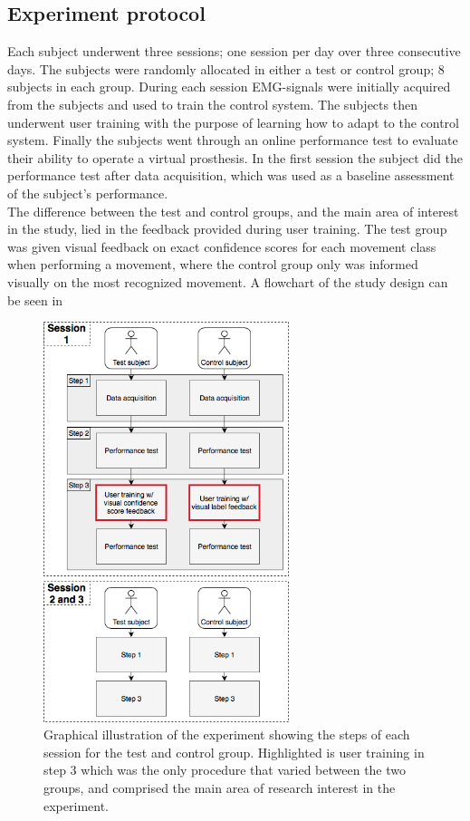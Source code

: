 \subsection{Experiment protocol}
Each subject underwent three sessions; one session per day over three consecutive days. The subjects were randomly allocated in either a test or control group; 8 subjects in each group. During each session EMG-signals were initially acquired from the subjects and used to train the control system. The subjects then underwent user training with the purpose of learning how to adapt to the control system. Finally the subjects went through an online performance test to evaluate their ability to operate a virtual prosthesis. In the first session the subject did the performance test after data acquisition, which was used as a baseline assessment of the subject's performance. \\
The difference between the test and control groups, and the main area of interest in the study, lied in the feedback provided during user training. The test group was given visual feedback on exact confidence scores for each movement class when performing a movement, where the control group only was informed visually on the most recognized movement. A flowchart of the study design can be seen in 


\begin{figure}[H]                                         
	\includegraphics[width=0.64\textwidth]{figures/Paper/Study_design}  
	\caption{Graphical illustration of the experiment showing the steps of each session for the test and control group. Highlighted is user training in step 3 which was the only procedure that varied between the two groups, and comprised the main area of research interest in the experiment.}
	\label{fig:P:std} 
\end{figure}